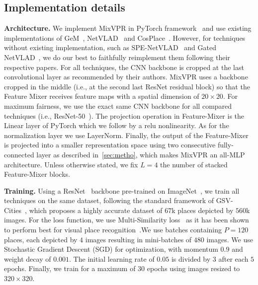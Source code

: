 \documentclass[10pt,twocolumn,letterpaper]{article}
\begin{document}
\subsection{Implementation details}
\noindent\textbf{Architecture.} We implement MixVPR in PyTorch framework~\cite{paszke2019pytorch} and use existing implementations of GeM~\cite{radenovic2018fine}, NetVLAD~\cite{arandjelovic2016netvlad} and CosPlace~\cite{berton2022rethinking}. However, for techniques without existing implementation, such as SPE-NetVLAD~\cite{yu2019spatial} and Gated NetVLAD~\cite{zhang2021vector}, we do our best to faithfully reimplement them following their respective papers.
For all techniques, the CNN backbone is cropped at the last convolutional layer as recommended by their authors. MixVPR uses a backbone cropped in the middle (i.e., at the second last ResNet residual block) so that the Feature Mixer receives feature maps with a spatial dimension of $20\times 20$.
For maximum fairness, we use the exact same CNN backbone for all compared techniques (i.e., ResNet-50~\cite{he2016deep}).
The projection operation in Feature-Mixer is the Linear layer of PyTorch which we follow by a relu nonlinearity. As for the normalization layer we use LayerNorm. Finally, the output of the Feature-Mixer is projected into a smaller representation space using two consecutive fully-connected layer as described in~\ref{sec:metho}, which makes MixVPR an all-MLP architecture. Unless otherwise stated, we fix $L=4$ the number of stacked Feature-Mixer blocks.

\noindent\textbf{Training.} Using a ResNet~\cite{he2016deep} backbone pre-trained on ImageNet~\cite{krizhevsky2012imagenet}, we train all techniques on the same dataset, following the standard framework of GSV-Cities~\cite{gsvcities}, which proposes a highly accurate dataset of $67$k places depicted by $560$k images. For the loss function, we use Multi-Similarity loss~\cite{wang2019multi} as it has been shown to perform best for visual place recognition~\cite{gsvcities}.We use batches containing $P=120$ places, each depicted by $4$ images resulting in mini-batches of $480$ images. We use Stochastic Gradient Descent (SGD) for optimization, with momentum $0.9$ and weight decay of $0.001$. The initial learning rate of $0.05$ is divided by $3$ after each $5$ epochs. Finally, we train for a maximum of $30$ epochs using images resized to $320 {\times} 320$.
\end{document}
